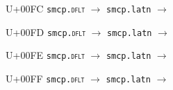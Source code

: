 \documentclass{article}
\begin{document}
\begin{substitutions}
\goodbreak

U+00FC  \linebreak
    \texttt{smcp.\textsc{dflt}} $\to$  \linebreak
    \texttt{smcp.latn} $\to$  

\goodbreak

U+00FD  \linebreak
    \texttt{smcp.\textsc{dflt}} $\to$  \linebreak
    \texttt{smcp.latn} $\to$  

\goodbreak

U+00FE  \linebreak
    \texttt{smcp.\textsc{dflt}} $\to$  \linebreak
    \texttt{smcp.latn} $\to$  

\goodbreak

U+00FF  \linebreak
    \texttt{smcp.\textsc{dflt}} $\to$  \linebreak
    \texttt{smcp.latn} $\to$  

\goodbreak

\end{substitutions}

\clearpage
\end{document}
